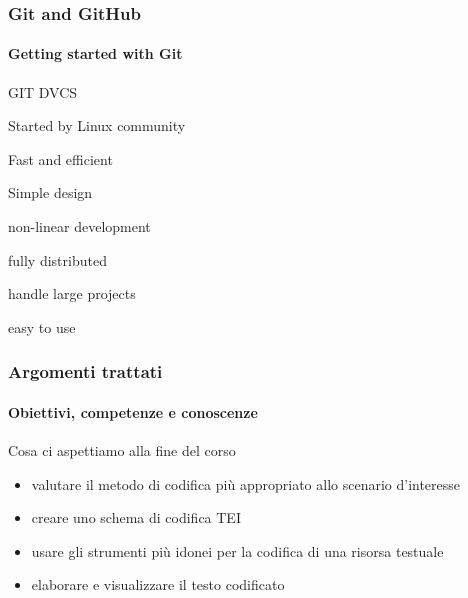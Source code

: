 \begin{frame}
    \frametitle{Git and GitHub}
    \framesubtitle{Getting started with Git}
    \addtocounter{nframe}{1}
    
    \begin{block}{GIT DVCS}
       \begin{block}
           \item Started by Linux community
           \item Fast and efficient 
           \item Simple design
           \item non-linear development
           \item fully distributed
           \item handle large projects
           \item easy to use
       \end{block}
    
    \end{block}

\end{frame}

\begin{frame}
    \frametitle{Argomenti trattati}
    \framesubtitle{Obiettivi, competenze e conoscenze}
    \addtocounter{nframe}{1}
    
    \begin{block}{Cosa ci aspettiamo alla fine del corso}
        \begin{itemize}
        \item valutare il metodo di codifica più appropriato allo scenario d'interesse
        \item creare uno schema di codifica TEI
        \item usare gli strumenti più idonei per la codifica di una risorsa testuale
        \item elaborare e visualizzare il testo codificato
        \end{itemize}
    \end{block}

\end{frame}


